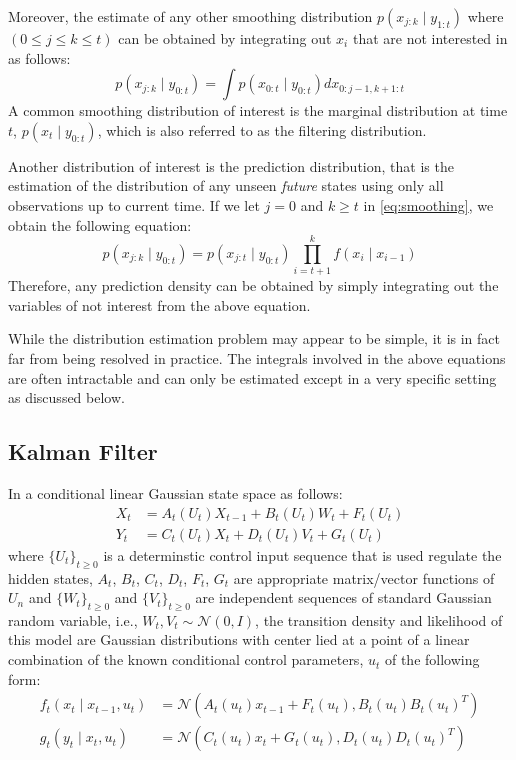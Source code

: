 Moreover, the estimate of any other smoothing distribution $p(x_{j:k} \mid y_{1:t})$ where $(0 \leq 	j \leq k\leq t)$ can be obtained by integrating out $x_i$ that are not interested in as follows:
\begin{equation}
  p(x_{j:k} \mid y_{0:t}) = \int p(x_{0:t} \mid y_{0:t}) dx_{0:j-1, k+1:t}
\label{eq:smoothing}
\end{equation}
A common smoothing distribution of interest is the marginal distribution at time $t$, $p(x_t \mid y_{0:t})$, which is also referred to as the filtering distribution.

Another distribution of interest is  the prediction distribution, that is the estimation of the distribution of any unseen \emph{future} states using only all observations up to current time. If we let $j = 0$ and $k \geq t$ in \eqref{eq:smoothing}, we obtain the following equation:
\begin{equation}
  p(x_{j:k} \mid y_{0:t}) = p(x_{j:t} \mid y_{0:t}) \prod^k_{i=t+1} f(x_i \mid x_{i-1})
\end{equation}
Therefore, any prediction density can be obtained by simply integrating out the variables of not interest from the above equation.

While the distribution estimation problem may appear to be simple, it is in fact far from being resolved in practice. The integrals involved in the above equations are often intractable and can only be estimated except in a very specific setting as discussed below.

\subsection{Kalman Filter}
\label{sec:KF}
In a conditional linear Gaussian state space as follows:
\begin{align}
  X_t &= A_t(U_t)X_{t-1} + B_t(U_t)W_t + F_t(U_t) \nonumber \\
  Y_t &= C_t(U_t)X_t + D_t(U_t)V_t + G_t(U_t)
\label{eq:gaussianmodel}
\end{align}
where $\{U_t\}_{t \geq 0}$ is a determinstic control input sequence that is used regulate the hidden states, $A_t$, $B_t$, $C_t$, $D_t$, $F_t$, $G_t$ are appropriate matrix/vector functions of $U_n$ and  $\{W_t\}_{t \geq 0}$ and  $\{V_t\}_{t \geq 0}$ are independent sequences of standard Gaussian random variable, i.e., $W_t, V_t \sim \mathcal{N}(0,I)$, the transition density and likelihood of this model are Gaussian distributions with center lied at a point of a linear combination of the known conditional control parameters, $u_t$ of the following form:
\begin{align}
  f_t(x_t \mid x_{t-1}, u_t) &= \mathcal{N}(A_t(u_t) x_{t-1} + F_t(u_t), B_t(u_t)B_t(u_t)^T) \nonumber \\
  g_t(y_t \mid x_t, u_t)    &= \mathcal{N}(C_t(u_t) x_t + G_t(u_t), D_t(u_t)D_t(u_t)^T)
\end{align}

